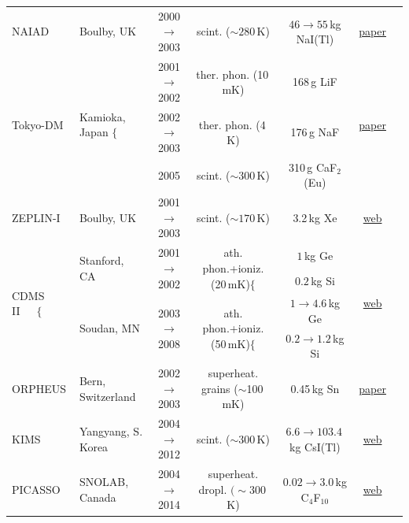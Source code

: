 \begin{table}
{\begin{tabular}{llccccc}
{\sc NAIAD} & Boulby, UK & 2000 $\to$ 2003 &   scint. ($\sim 280$\,K) & $46\to55$\,kg NaI(Tl) & \href{https://doi.org/10.1016/S0927-6505(03)00115-4}{paper} & \cite{NAIAD} \\

\multirow{3}{*}{{\sc Tokyo-DM}} & \multirow{3}{*}{Kamioka, Japan $\Biggr\{$} & 2001 $\to$ 2002 &  ther. phon. (10\,mK)  & 168\,g LiF & \multirow{3}{*}{\href{https://doi.org/10.1016/j.physletb.2005.12.025}{paper}}& \multirow{3}{*}{\cite{Tokyo-DM}} 
\\

 & & 2002 $\to$ 2003 &  ther. phon. (4\,K)  & 176\,g NaF &   &  
\\

 & & 2005 &  scint. ($\sim300$\,K)  & 310\,g CaF${}_2$(Eu) &   &  
\\

{\sc ZEPLIN-I} & Boulby, UK & 2001 $\to$ 2003 &  scint. ($\sim 170$\,K) & 3.2\,kg Xe & \href{https://hepwww.pp.rl.ac.uk/groups/ukdmc/project/ZEPLIN-I/zeplin-i.html}{web} & \cite{ZEPLIN-I} \\

\multirow{4}{*}{{\sc CDMS II}~~~$\Biggr\{$} & \multirow{2}{*}{Stanford, CA } & \multirow{2}{*}{2001 $\to$ 2002 } & \multirow{2}{*}{ath. phon.+ioniz. (20\,mK)$\Big\{$}& $1\,$kg Ge & \multirow{4}{*}{\href{https://www.slac.stanford.edu/exp/cdms/}{web}} & \multirow{4}{*}{\cite{CDMS-II}} 
\\
 &  &  &  & $0.2\,$kg Si &  & 
\\
 
 & \multirow{2}{*}{Soudan, MN} & \multirow{2}{*}{2003 $\to$ 2008 } &  \multirow{2}{*}{ath. phon.+ioniz. (50\,mK)$\Big\{$} & $1\to4.6\,$kg  Ge &  &  
\\
 &  &  &  & $0.2\to1.2\,$kg Si &  & 
\\
 
{\sc ORPHEUS} & Bern, Switzerland & 2002 $\to$ 2003 & superheat. grains ($\sim$100\,mK) & 0.45\,kg Sn & \href{https://doi.org/10.1016/j.astropartphys.2004.06.005}{paper} & \cite{ORPHEUS}
\\

{\sc KIMS} & Yangyang, S. Korea & 2004 $\to$ 2012 &  scint. ($\sim300\,$K) & $6.6\to 103.4$\,kg CsI(Tl) & \href{https://web.archive.org/web/20200218154113/http://q2c.snu.ac.kr/KIMS/KIMS_index.htm}{web} & \cite{KIMS}

\\

{\sc PICASSO} & SNOLAB, Canada & 2004 $\to$ 2014 &  superheat.  dropl. $(\sim 300\,$K)& $0.02\to3.0\,$kg C${}_4$F$_{10}$ & \href{http://www.picassoexperiment.ca}{web} & \cite{PICASSO}
\\


\end{tabular}}
\end{table}
